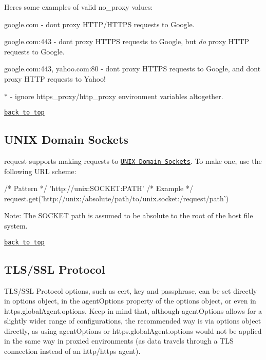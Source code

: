 Here\textquotesingle{}s some examples of valid {\ttfamily no\+\_\+proxy} values\+:


\begin{DoxyItemize}
\item {\ttfamily google.\+com} -\/ don\textquotesingle{}t proxy H\+T\+T\+P/\+H\+T\+T\+PS requests to Google.
\item {\ttfamily google.\+com\+:443} -\/ don\textquotesingle{}t proxy H\+T\+T\+PS requests to Google, but {\itshape do} proxy H\+T\+TP requests to Google.
\item {\ttfamily google.\+com\+:443, yahoo.\+com\+:80} -\/ don\textquotesingle{}t proxy H\+T\+T\+PS requests to Google, and don\textquotesingle{}t proxy H\+T\+TP requests to Yahoo!
\item {\ttfamily $\ast$} -\/ ignore {\ttfamily https\+\_\+proxy}/{\ttfamily http\+\_\+proxy} environment variables altogether.
\end{DoxyItemize}

\href{#table-of-contents}{\tt back to top}





\subsection*{U\+N\+IX Domain Sockets}

{\ttfamily request} supports making requests to \href{https://en.wikipedia.org/wiki/Unix_domain_socket}{\tt U\+N\+IX Domain Sockets}. To make one, use the following U\+RL scheme\+:


\begin{DoxyCode}
/* Pattern */ 'http://unix:SOCKET:PATH'
/* Example */ request.get('http://unix:/absolute/path/to/unix.socket:/request/path')
\end{DoxyCode}


Note\+: The {\ttfamily S\+O\+C\+K\+ET} path is assumed to be absolute to the root of the host file system.

\href{#table-of-contents}{\tt back to top}





\subsection*{T\+L\+S/\+S\+SL Protocol}

T\+L\+S/\+S\+SL Protocol options, such as {\ttfamily cert}, {\ttfamily key} and {\ttfamily passphrase}, can be set directly in {\ttfamily options} object, in the {\ttfamily agent\+Options} property of the {\ttfamily options} object, or even in {\ttfamily https.\+global\+Agent.\+options}. Keep in mind that, although {\ttfamily agent\+Options} allows for a slightly wider range of configurations, the recommended way is via {\ttfamily options} object directly, as using {\ttfamily agent\+Options} or {\ttfamily https.\+global\+Agent.\+options} would not be applied in the same way in proxied environments (as data travels through a T\+LS connection instead of an http/https agent).


